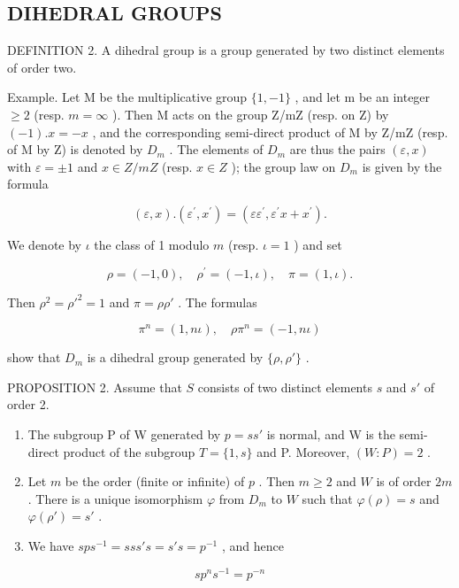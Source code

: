 \subsection{DIHEDRAL GROUPS}

DEFINITION 2. A dihedral group is a group generated by two distinct elements of order two.

Example. Let M be the multiplicative group \(\{1,-1\}\) , and let m be an integer \(\geqslant2\) (resp. \(m=\infty\) ). Then M acts on the group Z/mZ (resp. on Z) by \((-1).x=-x\) , and the corresponding semi-direct product of M by Z/mZ (resp. of M by Z) is denoted by \(D_{m}\) . The elements of \(D_{m}\) are thus the pairs \((\varepsilon,x)\) with \(\varepsilon=\pm1\) and \(x\in Z/mZ\) (resp. \(x\in Z\) ); the group law on \(D_{m}\) is given by the formula

\[
(\varepsilon , x). (\varepsilon^ {\prime}, x ^ {\prime}) = (\varepsilon \varepsilon^ {\prime}, \varepsilon^ {\prime} x + x ^ {\prime}).\tag{6}
\]

We denote by \(\iota\) the class of 1 modulo \(m\) (resp. \(\iota = 1\) ) and set

\[
\rho = (- 1, 0), \quad \rho^ {\prime} = (- 1, \iota), \quad \pi = (1, \iota).\tag{7}
\]

Then \(\rho^2 = \rho'^2 = 1\) and \(\pi = \rho \rho'\) . The formulas

\[
\pi^ {n} = (1, n \iota), \quad \rho \pi^ {n} = (- 1, n \iota)\tag{8}
\]

show that \(D_{m}\) is a dihedral group generated by \(\{\rho,\rho'\}\) .

PROPOSITION 2. Assume that \(S\) consists of two distinct elements \(s\) and \(s'\) of order 2.

\begin{enumerate}
\def\labelenumi{(\roman{enumi})}
\item
  The subgroup P of W generated by \(p = ss'\) is normal, and W is the semi-direct product of the subgroup \(T = \{1, s\}\) and P. Moreover, \((W : P) = 2\) .
\item
  Let \(m\) be the order (finite or infinite) of \(p\) . Then \(m \geqslant 2\) and \(W\) is of order \(2m\) . There is a unique isomorphism \(\varphi\) from \(D_m\) to \(W\) such that \(\varphi(\rho) = s\) and \(\varphi(\rho') = s'\) .
\item
  We have \(sps^{-1} = sss's = s's = p^{-1}\) , and hence
\end{enumerate}

\[
s p ^ {n} s ^ {- 1} = p ^ {- n}\tag{9}
\]

